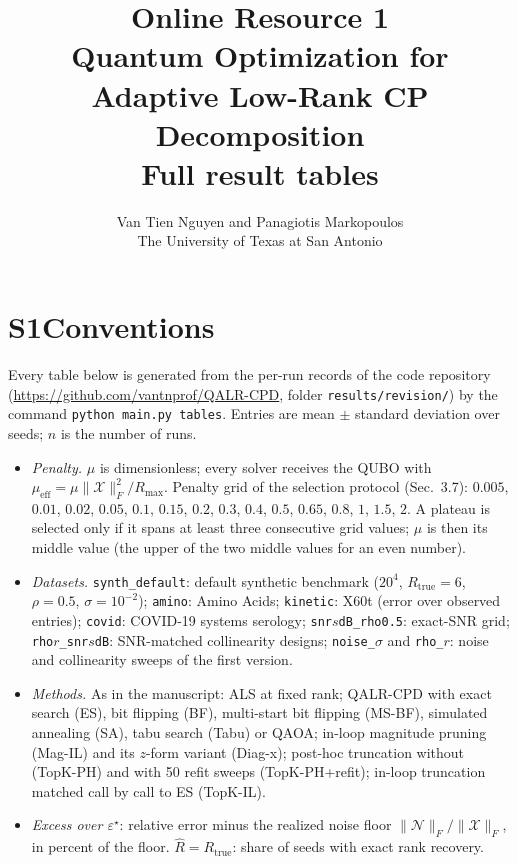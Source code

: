 \documentclass[10pt]{article}
\title{Online Resource 1\\[4pt]\large Quantum Optimization for Adaptive Low-Rank CP Decomposition\\
\normalsize Full result tables}
\author{Van Tien Nguyen and Panagiotis Markopoulos\\\small The University of Texas at San Antonio}
\date{}
\begin{document}
\maketitle

\section*{S1\quad Conventions}
Every table below is generated from the per-run records of the code repository
(\url{https://github.com/vantnprof/QALR-CPD}, folder \texttt{results/revision/}) by the command \texttt{python main.py tables}.
Entries are mean \(\pm\) standard deviation over seeds; \(n\) is the number of runs.

\begin{itemize}
\item \emph{Penalty.} \(\mu\) is dimensionless; every solver receives the QUBO with
\(\mu_{\mathrm{eff}}=\mu\|\mathcal X\|_F^2/R_{\max}\). Penalty grid of the selection protocol (Sec.~3.7): \(0.005\),
\(0.01\), \(0.02\), \(0.05\), \(0.1\), \(0.15\), \(0.2\), \(0.3\), \(0.4\), \(0.5\), \(0.65\), \(0.8\), \(1\), \(1.5\), \(2\).
A plateau is selected only if it spans at least three consecutive grid values; \(\mu\) is then its middle value (the
upper of the two middle values for an even number).
\item \emph{Datasets.} \texttt{synth\_default}: default synthetic benchmark (\(20^{4}\), \(R_{\mathrm{true}}=6\),
\(\rho=0.5\), \(\sigma=10^{-2}\)); \texttt{amino}: Amino Acids; \texttt{kinetic}: X60t (error over observed entries);
\texttt{covid}: COVID-19 systems serology; \texttt{snr}\(s\)\texttt{dB\_rho0.5}: exact-SNR grid;
\texttt{rho}\(r\)\texttt{\_snr}\(s\)\texttt{dB}: SNR-matched collinearity designs; \texttt{noise\_}\(\sigma\) and
\texttt{rho\_}\(r\): noise and collinearity sweeps of the first version.
\item \emph{Methods.} As in the manuscript: ALS at fixed rank; QALR-CPD with exact search (ES), bit flipping (BF),
multi-start bit flipping (MS-BF), simulated annealing (SA), tabu search (Tabu) or QAOA; in-loop magnitude pruning
(Mag-IL) and its \(z\)-form variant (Diag-x); post-hoc truncation without (TopK-PH) and with 50 refit sweeps
(TopK-PH+refit); in-loop truncation matched call by call to ES (TopK-IL).
\item \emph{Excess over \(\varepsilon^\star\)}: relative error minus the realized noise floor
\(\|\mathcal N\|_F/\|\mathcal X\|_F\), in percent of the floor. \(\hat R=R_{\mathrm{true}}\): share of seeds with exact
rank recovery.
\end{itemize}
\end{document}
